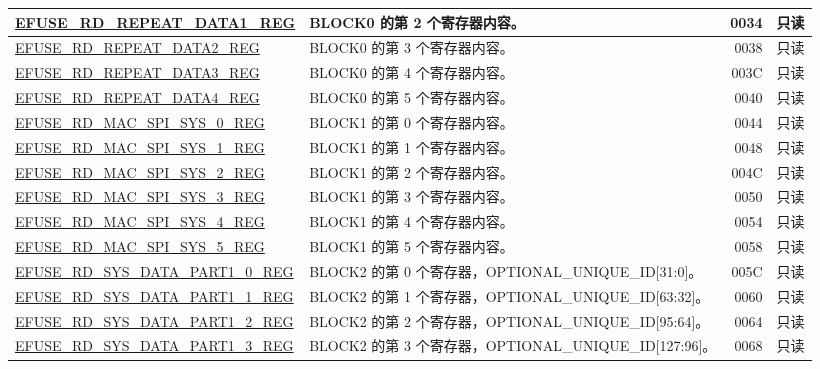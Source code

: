 \begin{longtable}{ | m{6cm} |m{7.2cm} | r| r | }
\hyperref[regdesc:EFUSERDREPEATDATA1REG]{EFUSE\_RD\_REPEAT\_DATA1\_REG} & BLOCK0 的第 2 个寄存器内容。 & \hexprefix{}0034 & 只读 \\ \hline
\hyperref[regdesc:EFUSERDREPEATDATA2REG]{EFUSE\_RD\_REPEAT\_DATA2\_REG} & BLOCK0 的第 3 个寄存器内容。 & \hexprefix{}0038 & 只读 \\ \hline
\hyperref[regdesc:EFUSERDREPEATDATA3REG]{EFUSE\_RD\_REPEAT\_DATA3\_REG} & BLOCK0 的第 4 个寄存器内容。 & \hexprefix{}003C & 只读 \\ \hline
\hyperref[regdesc:EFUSERDREPEATDATA4REG]{EFUSE\_RD\_REPEAT\_DATA4\_REG} & BLOCK0 的第 5 个寄存器内容。 & \hexprefix{}0040 & 只读 \\ \hline
\hyperref[regdesc:EFUSERDMACSPISYS0REG]{EFUSE\_RD\_MAC\_SPI\_SYS\_0\_REG} & BLOCK1 的第 0 个寄存器内容。 & \hexprefix{}0044 & 只读 \\ \hline
\hyperref[regdesc:EFUSERDMACSPISYS1REG]{EFUSE\_RD\_MAC\_SPI\_SYS\_1\_REG} & BLOCK1 的第 1 个寄存器内容。 & \hexprefix{}0048 & 只读 \\ \hline
\hyperref[regdesc:EFUSERDMACSPISYS2REG]{EFUSE\_RD\_MAC\_SPI\_SYS\_2\_REG} & BLOCK1 的第 2 个寄存器内容。 & \hexprefix{}004C & 只读 \\ \hline
\hyperref[regdesc:EFUSERDMACSPISYS3REG]{EFUSE\_RD\_MAC\_SPI\_SYS\_3\_REG} & BLOCK1 的第 3 个寄存器内容。 & \hexprefix{}0050 & 只读 \\ \hline
\hyperref[regdesc:EFUSERDMACSPISYS4REG]{EFUSE\_RD\_MAC\_SPI\_SYS\_4\_REG} & BLOCK1 的第 4 个寄存器内容。 & \hexprefix{}0054 & 只读 \\ \hline
\hyperref[regdesc:EFUSERDMACSPISYS5REG]{EFUSE\_RD\_MAC\_SPI\_SYS\_5\_REG} & BLOCK1 的第 5 个寄存器内容。 & \hexprefix{}0058 & 只读 \\ \hline
\hyperref[regdesc:EFUSERDSYSDATAPART10REG]{EFUSE\_RD\_SYS\_DATA\_PART1\_0\_REG} & BLOCK2 的第 0 个寄存器，OPTIONAL\_UNIQUE\_ID[31:0]。 & \hexprefix{}005C & 只读 \\ \hline
\hyperref[regdesc:EFUSERDSYSDATAPART11REG]{EFUSE\_RD\_SYS\_DATA\_PART1\_1\_REG} & BLOCK2 的第 1 个寄存器，OPTIONAL\_UNIQUE\_ID[63:32]。 & \hexprefix{}0060 & 只读 \\ \hline
\hyperref[regdesc:EFUSERDSYSDATAPART12REG]{EFUSE\_RD\_SYS\_DATA\_PART1\_2\_REG} & BLOCK2 的第 2 个寄存器，OPTIONAL\_UNIQUE\_ID[95:64]。 & \hexprefix{}0064 & 只读 \\ \hline
\hyperref[regdesc:EFUSERDSYSDATAPART13REG]{EFUSE\_RD\_SYS\_DATA\_PART1\_3\_REG} & BLOCK2 的第 3 个寄存器，OPTIONAL\_UNIQUE\_ID[127:96]。 & \hexprefix{}0068 & 只读 \\ \hline

\end{longtable}
